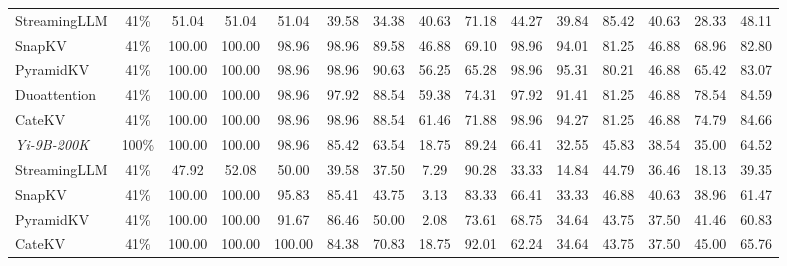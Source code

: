 \begin{table}[t]
\begin{tabular}{l|c|cccccccccccc|c}
StreamingLLM  & 41\% & 51.04 & 51.04 & 51.04 & 39.58 & 34.38 & 40.63 & 71.18 & 44.27 & 39.84 & 85.42 & 40.63 & 28.33 & 48.11 \\
SnapKV   & 41\% & 100.00 & 100.00 & 98.96 & 98.96 & 89.58 & 46.88 & 69.10 & 98.96 & 94.01 & 81.25 & 46.88 & 68.96 & 82.80 \\
PyramidKV  & 41\% & 100.00 & 100.00 & 98.96 & 98.96 & 90.63 &	56.25 &	65.28 &	98.96 &	95.31 &	80.21 &	46.88 & 65.42 & 83.07 \\
Duoattention & 41\% &	100.00 	&100.00 &	98.96 &	97.92 &	88.54 &	59.38 &	74.31 &	97.92 &	91.41 &	81.25 &	46.88 &	78.54 &	84.59 \\ 
\rowcolor{cyan!10}
CateKV  & 41\% & 100.00 & 100.00 & 98.96 & 98.96 & 88.54 & 61.46 & 71.88 & 98.96 & 94.27 & 81.25 & 46.88 & 74.79 & 84.66 \\
\midrule
\textit{Yi-9B-200K} & 100\% & 100.00 &	100.00 &	98.96 &	85.42 &	63.54 &	18.75 &	89.24 	&66.41 &	32.55 &	45.83 &	38.54 &	35.00 &	64.52 \\
StreamingLLM  & 41\% & 47.92 &	52.08 &	50.00 &	39.58 &	37.50 &	7.29 &	90.28 &	33.33 &	14.84 &	44.79 &	36.46 &	18.13 &	39.35 \\
SnapKV  & 41\% & 100.00 &	100.00 	&95.83 &	85.41 &	43.75 &	3.13 &	83.33 &	66.41 &	33.33 &	46.88 &	40.63 &	38.96 &	61.47 \\
PyramidKV  & 41\% & 100.00 &	100.00 &	91.67 &	86.46 &	50.00 &	2.08 &	73.61 &	68.75 &	34.64 &	43.75 &	37.50 &	41.46 &	60.83 \\
\rowcolor{cyan!10}
CateKV  & 41\% & 100.00 &	100.00 	&100.00 &	84.38 	&70.83 &	18.75 &	92.01 &	62.24 &	34.64 &	43.75 &	37.50 &	45.00 	&65.76 \\
\bottomrule
\end{tabular}
\label{tab:ruler-128k-eviction}
\vspace{-0.3cm}
\end{table}
